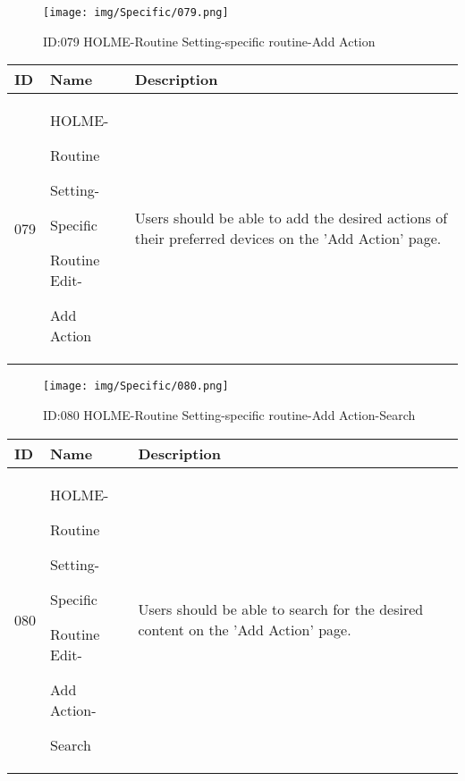 \documentclass[conference]{IEEEtran}
\begin{document}
\begin{enumerate}
\begin{figure}[h]
\centering                                         
\texttt{[image: img/Specific/079.png]}
\caption{ID:079 HOLME-Routine Setting-specific routine-Add Action}
\end{figure}
\begin{table}[h]
\def\arraystretch{1.2} \small
    \begin{tabular}{|p{1cm}|p{1.8cm}|p{5.0cm}|}
        \hline
        ID & Name & Description\\ \hline
         079 \par  & HOLME-\par Routine \par Setting- \par Specific  \par Routine Edit- \par Add Action & 
         Users should be able to add the desired actions of their preferred devices on the 'Add Action' page.
         \\ \hline
    \end{tabular}
\end{table}

\begin{figure}[h]
\centering                                         
\texttt{[image: img/Specific/080.png]}
\caption{ID:080 HOLME-Routine Setting-specific routine-Add Action-Search}
\end{figure}
\begin{table}[h]
\def\arraystretch{1.2} \small
    \begin{tabular}{|p{1cm}|p{1.8cm}|p{5.0cm}|}
        \hline
        ID & Name & Description\\ \hline
         080 \par  & HOLME-\par Routine \par Setting- \par Specific  \par Routine Edit- \par Add Action- \par Search & 
         Users should be able to search for the desired content on the 'Add Action' page.
         \\ \hline
    \end{tabular}
\end{table}
\clearpage


\end{enumerate}
\end{document}
